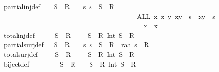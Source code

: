 \begin{isabellebody}
partial{\isacharunderscore}inj{\isacharunderscore}def{\isacharcolon}\ \ \ \ {\isachardoublequoteopen}S\ {\isachargreater}{\isacharminus}{\isacharbar}{\isacharminus}{\isachargreater}\ R\ \ \ {\isacharequal}{\isacharequal}\ {\isacharbraceleft}s{\isachardot}\ s\ {\isacharcolon}\ S\ {\isacharminus}{\isacharbar}{\isacharminus}{\isachargreater}\ R\ {\isacharampersand}\isanewline
\ \ \ \ \ \ \ \ \ \ \ \ \ \ \ \ \ \ \ \ \ \ \ \ \ \ \ \ \ \ \ \ \ \ \ \ \ \ \ {\isacharparenleft}ALL\ x{}\ x{}\ y{\isachardot}\ {\isacharparenleft}x{}{\isacharcomma}y{\isacharparenright}\ {\isacharcolon}\ s\ {\isacharampersand}\ {\isacharparenleft}x{}{\isacharcomma}y{\isacharparenright}\ {\isacharcolon}\ s\ \isanewline
\ \ \ \ \ \ \ \ \ \ \ \ \ \ \ \ \ \ \ \ \ \ \ \ \ \ \ \ \ \ \ \ \ \ \ \ \ \ \ \ {\isacharminus}{\isacharminus}{\isachargreater}\ x{}\ {\isacharequal}\ x{}{\isacharparenright}{\isacharbraceright}{\isachardoublequoteclose}\isanewline
total{\isacharunderscore}inj{\isacharunderscore}def{\isacharcolon}\ \ \ \ \ \ {\isachardoublequoteopen}S\ {\isachargreater}{\isacharminus}{\isacharminus}{\isachargreater}\ R\ \ \ \ {\isacharequal}{\isacharequal}\ {\isacharparenleft}S\ {\isachargreater}{\isacharminus}{\isacharbar}{\isacharminus}{\isachargreater}\ R{\isacharparenright}\ Int\ {\isacharparenleft}S\ {\isacharminus}{\isacharminus}{\isacharminus}{\isachargreater}\ R{\isacharparenright}{\isachardoublequoteclose}\isanewline
partial{\isacharunderscore}surj{\isacharunderscore}def{\isacharcolon}\ \ \ {\isachardoublequoteopen}S\ {\isacharminus}{\isacharbar}{\isacharminus}{\isachargreater}{\isachargreater}\ R\ \ \ {\isacharequal}{\isacharequal}\ {\isacharbraceleft}s{\isachardot}\ s\ {\isacharcolon}\ S\ {\isacharminus}{\isacharbar}{\isacharminus}{\isachargreater}\ R\ {\isacharampersand}\ ran\ s\ {\isacharequal}\ R{\isacharbraceright}{\isachardoublequoteclose}\isanewline
total{\isacharunderscore}surj{\isacharunderscore}def{\isacharcolon}\ \ \ \ \ {\isachardoublequoteopen}S\ {\isacharminus}{\isacharminus}{\isachargreater}{\isachargreater}\ R\ \ \ \ {\isacharequal}{\isacharequal}\ {\isacharparenleft}S\ {\isacharminus}{\isacharbar}{\isacharminus}{\isachargreater}{\isachargreater}\ R{\isacharparenright}\ Int\ {\isacharparenleft}S\ {\isacharminus}{\isacharminus}{\isacharminus}{\isachargreater}\ R{\isacharparenright}{\isachardoublequoteclose}\isanewline
biject{\isacharunderscore}def{\isacharcolon}\ \ \ \ \ \ \ \ \ {\isachardoublequoteopen}S\ {\isachargreater}{\isacharminus}{\isacharminus}{\isachargreater}{\isachargreater}\ R\ \ \ {\isacharequal}{\isacharequal}\ {\isacharparenleft}S\ {\isacharminus}{\isacharminus}{\isachargreater}{\isachargreater}\ R{\isacharparenright}\ Int\ {\isacharparenleft}S\ {\isachargreater}{\isacharminus}{\isacharminus}{\isachargreater}\ R{\isacharparenright}{\isachardoublequoteclose}\isanewline

\end{isabellebody}
